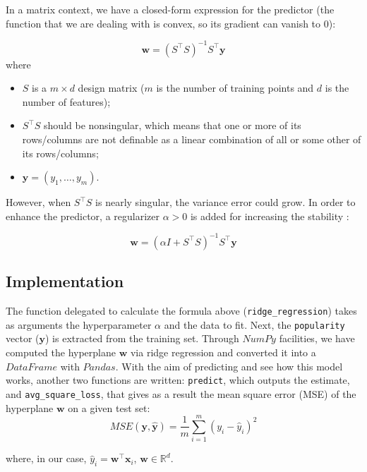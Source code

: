 \documentclass{article}
\begin{document}
In a matrix context, we have a closed-form expression for the predictor (the function that we are dealing with is convex, so its gradient can vanish to $0$):
    
\begin{equation}
	\boldsymbol{w} = (S^\top S)^{-1}S^\top \boldsymbol{y}
\end{equation}
where 
\begin{itemize}
	\item $S$ is a $m \times d$ design matrix ($m$ is the number of training points and $d$ is the number of features);
	\item $S^\top S$ should be nonsingular, which means that one or more of its rows/columns are not definable as a linear combination of all or some other of its rows/columns;
	\item $\boldsymbol{y} = (y_1, \dots , y_m)$.
\end{itemize}
    
However, when $S^\top S$ is nearly singular, the variance error could grow. In order to enhance the predictor, a regularizer $\alpha > 0$ is added for increasing the stability \cite{profrr}:

\begin{equation}
	\boldsymbol{w} = (\alpha I + S^\top S)^{-1}S^\top \boldsymbol{y}
\end{equation}

\subsection{Implementation}
The function delegated to calculate the formula above (\texttt{ridge\_regression}) takes as arguments the hyperparameter $\alpha$ and the data to fit. Next, the \texttt{popularity} vector ($\boldsymbol{y}$) is extracted from the training set. Through $NumPy$ facilities, we have computed the hyperplane $\boldsymbol{w}$ via ridge regression and converted it into a $DataFrame$ with $Pandas$. 
With the aim of predicting and see how this model works, another two functions are written:
\texttt{predict}, which outputs the estimate, and \texttt{avg\_square\_loss}, that gives as a result the mean square error (MSE) of the hyperplane $\boldsymbol{w}$ on a given test set: 
\begin{equation}
	\label{MSE}MSE(\boldsymbol{y},\boldsymbol{\hat{y}}) = \frac{1}{m}\sum_{i = 1}^m (y_i-\hat{y}_i)^2
\end{equation}
    
where, in our case, $\hat{y}_i= \boldsymbol{w}^\top \boldsymbol{x}_i$, $\boldsymbol{w} \in \mathbb{R}^d$.
    
\end{document}
